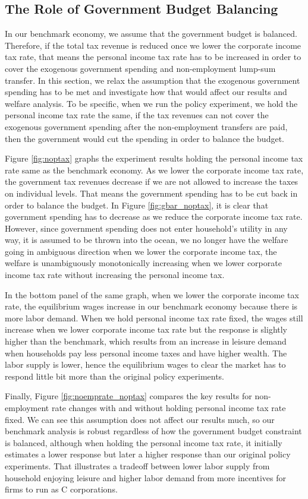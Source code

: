 \documentclass[12pt]{article}
\begin{document}
\subsection{The Role of Government Budget Balancing}
In our benchmark economy, we assume that the government budget is balanced. Therefore, if the total tax revenue is reduced once we lower the corporate income tax rate, that means the personal income tax rate has to be increased in order to cover the exogenous government spending and non-employment lump-sum transfer. In this section, we relax the assumption that the exogenous government spending has to be met and investigate how that would affect our results and welfare analysis. To be specific, when we run the policy experiment, we hold the personal income tax rate the same, if the tax revenues can not cover the exogenous government spending after the non-employment transfers are paid, then the government would cut the spending in order to balance the budget.

Figure \ref{fig:noptax} graphs the experiment results holding the personal income tax rate same as the benchmark economy. As we lower the corporate income tax rate, the government tax revenues decrease if we are not allowed to increase the taxes on individual levels. That means the government spending has to be cut back in order to balance the budget. In Figure \ref{fig:gbar_noptax}, it is clear that government spending has to decrease as we reduce the corporate income tax rate. However, since government spending does not enter household's utility in any way, it is assumed to be thrown into the ocean, we no longer have the welfare going in ambiguous direction when we lower the corporate income tax, the welfare is unambiguously monotonically increasing when we lower corporate income tax rate without increasing the personal income tax. 

In the bottom panel of the same graph, when we lower the corporate income tax rate, the equilibrium wages increase in our benchmark economy because there is more labor demand. When we hold personal income tax rate fixed, the wages still increase when we lower corporate income tax rate but the response is slightly higher than the benchmark, which results from an increase in leisure demand when households pay less personal income taxes and have higher wealth. The labor supply is lower, hence the equilibrium wages to clear the market has to respond little bit more than the original policy experiments.

Finally, Figure \ref{fig:noemprate_noptax} compares the key results for non-employment rate changes with and without holding personal income tax rate fixed. We can see this assumption does not affect our results much, so our benchmark analysis is robust regardless of how the government budget constraint is balanced, although when holding the personal income tax rate, it initially estimates a lower response but later a higher response than our original policy experiments. That illustrates a tradeoff between lower labor supply from household enjoying leisure and higher labor demand from more incentives for firms to run as C corporations. 
\end{document}
